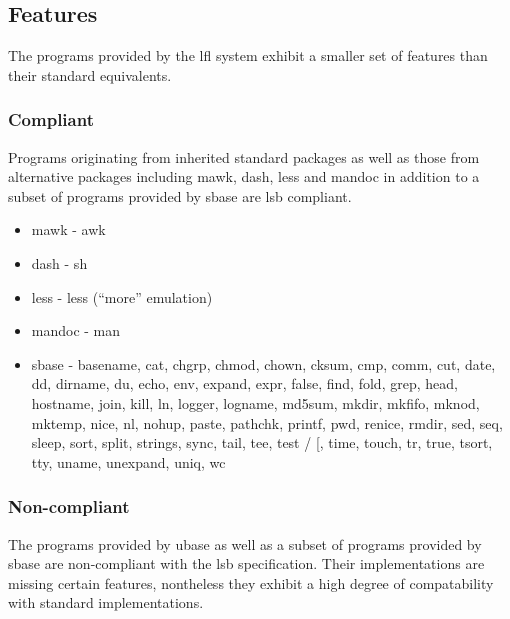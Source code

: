 \subsection{Features}\label{Features}

The programs provided by the \gls{lfl} system exhibit a smaller set of features than their standard equivalents.

\subsubsection{Compliant}

Programs originating from inherited standard packages as well as those from alternative packages including mawk, dash, less and mandoc in addition to a subset of programs provided by sbase are \gls{lsb} compliant.

\begin{itemize}
    \item mawk - awk
    \item dash - sh
    \item less - less (\enquote{more} emulation)
    \item mandoc - man
    \item sbase - basename, cat, chgrp, chmod, chown, cksum, cmp, comm, cut, date, dd, dirname, du, echo, env, expand, expr, false, find, fold, grep, head, hostname, join, kill, ln, logger, logname, md5sum, mkdir, mkfifo, mknod, mktemp, nice, nl, nohup, paste, pathchk, printf, pwd, renice, rmdir, sed, seq, sleep, sort, split, strings, sync, tail, tee, test / [, time, touch, tr, true, tsort, tty, uname, unexpand, uniq, wc
\end{itemize}

\subsubsection{Non-compliant}

The programs provided by ubase as well as a subset of programs provided by sbase are non-compliant with the \gls{lsb} specification. Their implementations are missing certain features, nontheless they exhibit a high degree of compatability with standard implementations.


